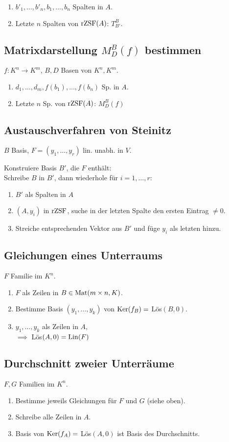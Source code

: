 \begin{enumerate}
	\item $b'_1,\dots,b'_n,b_1,\dots,b_n$ Spalten in $A$.
	\item Letzte $n$ Spalten von $\operatorname{rZSF}(A)$: $T_{B'}^B$.
\end{enumerate}

\subsection*{Matrixdarstellung $M_D^B(f)$ bestimmen}
$f:K^n\to K^m$, $B,D$ Basen von $K^n,K^m$.
\begin{enumerate}
	\item $d_1,\dots,d_m,f(b_1),\dots,f(b_n)$ Sp. in $A$.
	\item Letzte $n$ Sp. von $\operatorname{rZSF}(A)$: $M_D^B(f)$
\end{enumerate}

\subsection*{Austauschverfahren von Steinitz}
$B$ Basis, $F=(y_1,\dots,y_r)$ lin. unabh. in $V$.

Konstruiere Basis $B'$, die $F$ enthält: \\
Schreibe $B$ in $B'$, dann wiederhole für $i=1,\dots,r$:
\begin{enumerate}
	\item $B'$ als Spalten in $A$
	\item $(A,y_i)$ in $\operatorname{rZSF}$, suche in der letzten Spalte den ersten Eintrag $\neq 0$.
	\item Streiche entsprechenden Vektor aus $B'$ und füge $y_i$ als letzten hinzu.
\end{enumerate}

\subsection*{Gleichungen eines Unterraums}
$F$ Familie im $K^n$.

\begin{enumerate}
	\item $F$ als Zeilen in $B\in\operatorname{Mat}(m \times n,K)$.
	\item Bestimme Basis $(y_1,\dots,y_k)$ von $\operatorname{Ker}(f_B)=$ Lös$(B,0)$.
	\item $y_1,\dots,y_k$ als Zeilen in $A$, \\
		$\implies$ Lös$(A,0)=\operatorname{Lin}(F)$ 
\end{enumerate}

\subsection*{Durchschnitt zweier Unterräume}
$F,G$ Familien im $K^n$.
\begin{enumerate}
	\item Bestimme jeweils Gleichungen für $F$ und $G$ (siehe oben).
	\item Schreibe alle Zeilen in $A$.
	\item Basis von $\operatorname{Ker}(f_A)=$ Lös$(A,0)$ ist Basis des Durchschnitts.
\end{enumerate}
